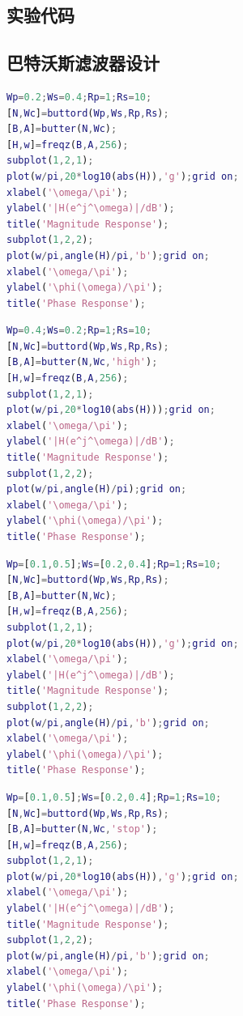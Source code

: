 \documentclass[12pt,AutoFakeBold]{article}
\begin{document}
\newpage
\begin{appendices}  %
\section{实验代码}

\subsection{巴特沃斯滤波器设计}

\begin{lstlisting}[language=Matlab]
%低通
Wp=0.2;Ws=0.4;Rp=1;Rs=10;
[N,Wc]=buttord(Wp,Ws,Rp,Rs);
[B,A]=butter(N,Wc);
[H,w]=freqz(B,A,256);
subplot(1,2,1);
plot(w/pi,20*log10(abs(H)),'g');grid on;
xlabel('\omega/\pi');
ylabel('|H(e^j^\omega)|/dB');
title('Magnitude Response');
subplot(1,2,2);
plot(w/pi,angle(H)/pi,'b');grid on;
xlabel('\omega/\pi');
ylabel('\phi(\omega)/\pi');
title('Phase Response');
\end{lstlisting}

\begin{lstlisting}[language=Matlab]
%高通
Wp=0.4;Ws=0.2;Rp=1;Rs=10;
[N,Wc]=buttord(Wp,Ws,Rp,Rs);
[B,A]=butter(N,Wc,'high');
[H,w]=freqz(B,A,256);
subplot(1,2,1);
plot(w/pi,20*log10(abs(H)));grid on;
xlabel('\omega/\pi');
ylabel('|H(e^j^\omega)|/dB');
title('Magnitude Response');
subplot(1,2,2);
plot(w/pi,angle(H)/pi);grid on;
xlabel('\omega/\pi');
ylabel('\phi(\omega)/\pi');
title('Phase Response');
\end{lstlisting}

\begin{lstlisting}[language=Matlab]
%带通
Wp=[0.1,0.5];Ws=[0.2,0.4];Rp=1;Rs=10;
[N,Wc]=buttord(Wp,Ws,Rp,Rs);
[B,A]=butter(N,Wc);
[H,w]=freqz(B,A,256);
subplot(1,2,1);
plot(w/pi,20*log10(abs(H)),'g');grid on;
xlabel('\omega/\pi');
ylabel('|H(e^j^\omega)|/dB');
title('Magnitude Response');
subplot(1,2,2);
plot(w/pi,angle(H)/pi,'b');grid on;
xlabel('\omega/\pi');
ylabel('\phi(\omega)/\pi');
title('Phase Response');
\end{lstlisting}

\begin{lstlisting}[language=Matlab]
%带阻
Wp=[0.1,0.5];Ws=[0.2,0.4];Rp=1;Rs=10;
[N,Wc]=buttord(Wp,Ws,Rp,Rs);
[B,A]=butter(N,Wc,'stop');
[H,w]=freqz(B,A,256);
subplot(1,2,1);
plot(w/pi,20*log10(abs(H)),'g');grid on;
xlabel('\omega/\pi');
ylabel('|H(e^j^\omega)|/dB');
title('Magnitude Response');
subplot(1,2,2);
plot(w/pi,angle(H)/pi,'b');grid on;
xlabel('\omega/\pi');
ylabel('\phi(\omega)/\pi');
title('Phase Response');
\end{lstlisting}


\end{appendices}
\end{document}
